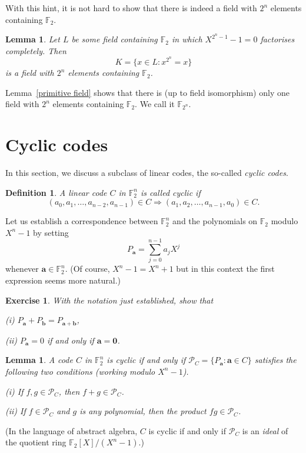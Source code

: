 \documentclass[12pt,a4paper]{article}
\theoremstyle{plain}
\newtheorem{lemma}[theorem]{Lemma}
\newtheorem{definition}[theorem]{Definition}
\newtheorem{exercise}[theorem]{Exercise}
\theoremstyle{definition}
\begin{document}
With this hint, it is not hard to show that there is
indeed a field with $2^{n}$ elements
containing ${\mathbb F}_{2}$.
\begin{lemma}\label{Galois}
Let $L$ be some field containing
${\mathbb F}_{2}$ in which $X^{2^{n}-1}-1=0$
factorises completely. Then
\[K=\{x\in L:x^{2^{n}}=x\}\]
is a field with $2^{n}$ elements
containing ${\mathbb F}_{2}$.
\end{lemma}

Lemma~\ref{primitive field} shows that
there is (up to field isomorphism) only one
field with $2^{n}$ elements
containing ${\mathbb F}_{2}$.
We call it ${\mathbb F}_{2^{n}}$.
\section{Cyclic codes} In this section, we
discuss a subclass of linear codes, the
so-called \emph{cyclic codes}.
\begin{definition} A linear code $C$
in ${\mathbb F}^{n}_{2}$
is called \emph{cyclic} if
\[(a_{0},a_{1},\dots,a_{n-2},a_{n-1})\in C
\Rightarrow (a_{1},a_{2},\dots,a_{n-1},a_{0})\in C.\]
\end{definition}
Let us establish a correspondence between
${\mathbb F}^{n}_{2}$ and the polynomials
on ${\mathbb F}_{2}$ modulo $X^{n}-1$
by setting
\[P_{\mathbf a}=\sum_{j=0}^{n-1}a_{j}X^{j}\]
whenever ${\mathbf a}\in {\mathbb F}_{2}^{n}$.
(Of course, $X^{n}-1=X^{n}+1$ but in this context
the first expression seems more natural.)
\begin{exercise} With the notation
just established, show that

(i) $P_{\mathbf a}+P_{\mathbf b}=P_{{\mathbf a}+{\mathbf b}}$,

(ii) $P_{\mathbf a}=0$ if and only if ${\mathbf a}={\boldsymbol 0}$.
\end{exercise}

\begin{lemma} A  code $C$
in ${\mathbb F}^{n}_{2}$
is cyclic if and only if
${\mathcal P}_{C}=\{P_{\mathbf a}:{\mathbf a}\in C\}$
satisfies the following two
conditions (working modulo $X^{n}-1$).

(i) If $f,g\in {\mathcal P}_{C}$, then $f+g\in {\mathcal P}_{C}$.

(ii) If $f\in {\mathcal P}_{C}$ and $g$ is
any polynomial, then the product $fg\in{\mathcal P}_{C}$.
\end{lemma}
\noindent
(In the language of abstract algebra, $C$
is cyclic if and only if
${\mathcal P}_{C}$ is an \emph{ideal} of the
quotient ring ${\mathbb F}_{2}[X]/(X^{n}-1)$.)
\end{document}
